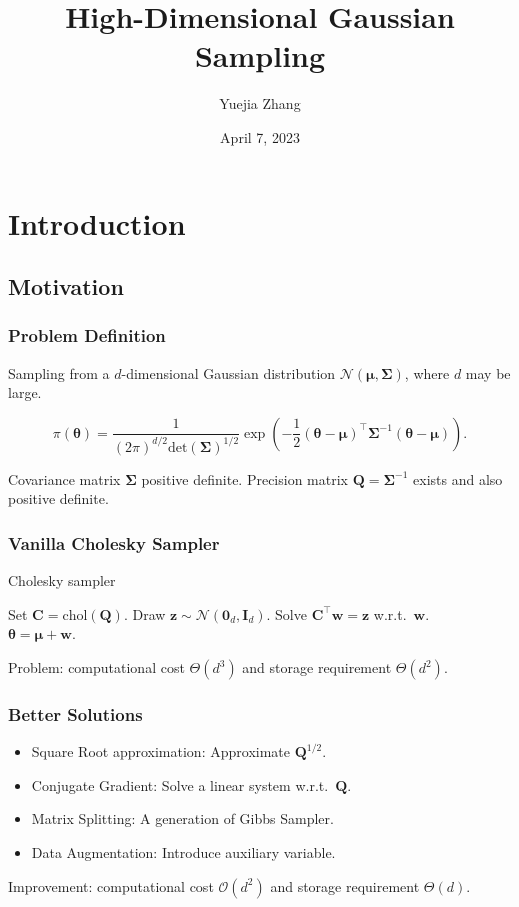 \documentclass[aspectratio=169]{beamer}
\title{High-Dimensional Gaussian Sampling}
\author{Yuejia Zhang}
\date{April 7, 2023}
\newcommand{\B}[1]{\mathbf{#1}} %
\newcommand{\Bs}[1]{\boldsymbol{#1}} %
\newcommand{\pr}[1]{\left(#1\right)} %
\begin{document}
	
\begin{frame}
    \maketitle
\end{frame}

\section{Introduction} 
\subsection{Motivation}
\begin{frame}
\frametitle{Problem Definition}
Sampling from a \(d\)-dimensional Gaussian distribution \(\mathcal{N}\pr{\Bs{\mu},\B{\Sigma}}\), where \(d\) may be large.

\[
    \pi(\Bs{\theta}) = \dfrac{1}{(2\pi)^{d/2}\text{det}(\B{\Sigma})^{1/2}}\exp\pr{-\dfrac{1}{2}(\Bs{\theta}-\Bs{\mu})^{\top}\B{\Sigma}^{-1}(\Bs{\theta}-\Bs{\mu})}.
\]

Covariance matrix \(\B{\Sigma}\) positive definite. Precision matrix \(\B{Q}=\B{\Sigma}^{-1}\) exists and also positive definite.
\end{frame}

\begin{frame}
\frametitle{Vanilla Cholesky Sampler}
\begin{algorithm}[H]
\caption{Cholesky sampler}
\begin{algorithmic}[1]
\State Set $\B{C} = \mathrm{chol}(\B{Q})$.
\Comment{\textcolor{blue}{$\B{Q} = \B{C}\B{C}^{\top}$}}
\State Draw $\B{z} \sim \mathcal{N}(\B{0}_d,\B{I}_d)$.
\State Solve $\B{C}^{\top}\B{w} = \B{z}$ w.r.t.\ $\B{w}$.\\
\Return $\Bs{\theta} = \Bs{\mu} + \B{w}$.
\end{algorithmic}
\end{algorithm}
Problem: computational cost $\Theta(d^3)$ and storage requirement $\Theta(d^2)$.
\end{frame}

\begin{frame}
\frametitle{Better Solutions}
\begin{itemize}
    \item Square Root approximation: Approximate \(\B{Q}^{1/2}\).
    \item Conjugate Gradient: Solve a linear system w.r.t.\ \(\B{Q}\).
    \item Matrix Splitting: A generation of Gibbs Sampler.
    \item Data Augmentation: Introduce auxiliary variable.
\end{itemize}
Improvement: computational cost $\mathcal{O}(d^2)$ and storage requirement $\Theta(d)$.
\end{frame}
\end{document}
